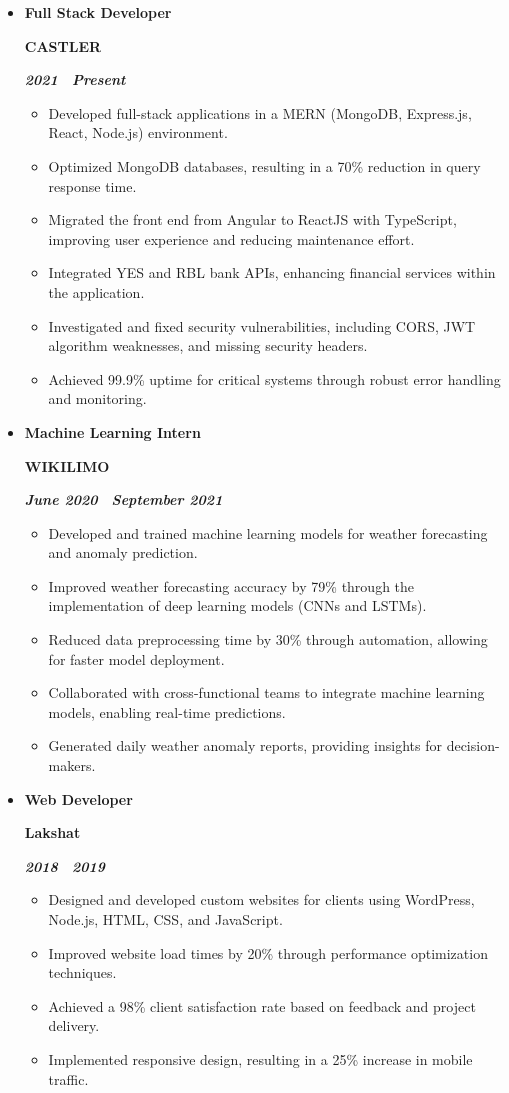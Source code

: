 \documentclass[10pt,letterpaper]{article}
\newcommand{\textbox}[1]{
  \parbox{.333\textwidth}{#1}
}
\newcommand{\titleExperienceWithoutLocation}[4]{
  \vspace{1.0em}
  \item[]
  {
    \textbox{\textbf{#1}\hfill}\textbox{\hfil \textbf{#2}\hfil}\hfill \textbf{\emph{#3 \textendash \ #4}}
  }
}
\begin{document}
  \begin{itemize}[noitemsep,topsep=0pt]
    
    \titleExperienceWithoutLocation{Full Stack Developer}{CASTLER}{2021}{Present}
    \begin{itemize}[label=\textbullet,noitemsep,topsep=0pt]
      \item Developed full-stack applications in a MERN (MongoDB, Express.js, React, Node.js) environment.
      \item Optimized MongoDB databases, resulting in a 70\% reduction in query response time.
      \item Migrated the front end from Angular to ReactJS with TypeScript, improving user experience and reducing maintenance effort.
      \item Integrated YES and RBL bank APIs, enhancing financial services within the application.
      \item Investigated and fixed security vulnerabilities, including CORS, JWT algorithm weaknesses, and missing security headers.
      \item Achieved 99.9\% uptime for critical systems through robust error handling and monitoring.
    \end{itemize}
  
    \titleExperienceWithoutLocation{Machine Learning Intern}{WIKILIMO}{June 2020}{September 2021}
    \begin{itemize}[label=\textbullet,noitemsep,topsep=0pt]
      \item Developed and trained machine learning models for weather forecasting and anomaly prediction.
      \item Improved weather forecasting accuracy by 79\% through the implementation of deep learning models (CNNs and LSTMs).
      \item Reduced data preprocessing time by 30\% through automation, allowing for faster model deployment.
      \item Collaborated with cross-functional teams to integrate machine learning models, enabling real-time predictions.
      \item Generated daily weather anomaly reports, providing insights for decision-makers.
    \end{itemize}
  
    \titleExperienceWithoutLocation{Web Developer}{Lakshat}{2018}{2019}
    \begin{itemize}[label=\textbullet,noitemsep,topsep=0pt]
      \item Designed and developed custom websites for clients using WordPress, Node.js, HTML, CSS, and JavaScript.
      \item Improved website load times by 20\% through performance optimization techniques.
      \item Achieved a 98\% client satisfaction rate based on feedback and project delivery.
      \item Implemented responsive design, resulting in a 25\% increase in mobile traffic.
    \end{itemize}
  \end{itemize}
\end{document}
